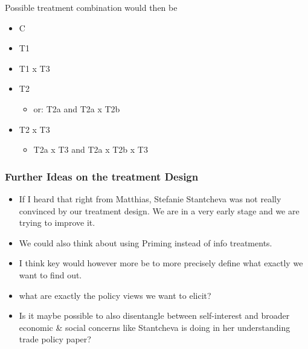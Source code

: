 \documentclass[a4paper, 12pt]{article}
\begin{document}
Possible treatment combination would then be
\begin{itemize}
    \item C
    \item T1
    \item T1 x T3
    \item T2 
    \begin{itemize}
        \item or: T2a and T2a x T2b
    \end{itemize}
    \item T2 x T3
    \begin{itemize}
        \item T2a x T3 and T2a x T2b x T3
    \end{itemize}
\end{itemize}
\subsubsection{Further Ideas on the treatment Design}
\begin{itemize}
    \item If I heard that right from Matthias, Stefanie Stantcheva was not really convinced by our treatment design. We are in a very early stage and we are trying to improve it. 
    \item We could also think about using Priming instead of info treatments.
    \item I think key would however more be to more precisely define what exactly we want to find out. 
    \item what are exactly the policy views we want to elicit? 
    \item Is it maybe possible to also disentangle between self-interest and broader economic \& social concerns like Stantcheva is doing in her understanding trade policy paper?
\end{itemize}
\end{document}
